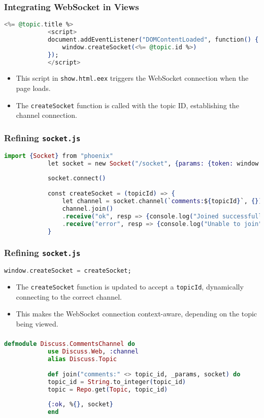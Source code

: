 \documentclass[aspectratio=169, table]{beamer}
\begin{document}
	\begin{frame}[fragile]
		\frametitle{Integrating WebSocket in Views}
		\begin{lstlisting}[language=Elixir]
			<%= @topic.title %>
			<script>
			document.addEventListener("DOMContentLoaded", function() {
				window.createSocket(<%= @topic.id %>)
			}); 
			</script>
		\end{lstlisting}
		\begin{itemize}
			\item This script in \texttt{show.html.eex} triggers the WebSocket connection when the page loads.
			\item The \texttt{createSocket} function is called with the topic ID, establishing the channel connection.
		\end{itemize}
	\end{frame}
	
	\begin{frame}[fragile]
		\frametitle{Refining \texttt{socket.js}}
		\begin{lstlisting}[language=Elixir]
			import {Socket} from "phoenix"
			let socket = new Socket("/socket", {params: {token: window.userToken}})
			
			socket.connect()
			
			const createSocket = (topicId) => {
				let channel = socket.channel(`comments:${topicId}`, {})
				channel.join()
				.receive("ok", resp => {console.log("Joined successfully", resp)})
				.receive("error", resp => {console.log("Unable to join", resp)})
			}
		\end{lstlisting}
	\end{frame}
	
	\begin{frame}[fragile]
		\frametitle{Refining \texttt{socket.js}}
		\begin{lstlisting}[language=Elixir]
			window.createSocket = createSocket;
		\end{lstlisting}
		\begin{itemize}
			\item The \texttt{createSocket} function is updated to accept a \texttt{topicId}, dynamically connecting to the correct channel.
			\item This makes the WebSocket connection context-aware, depending on the topic being viewed.
		\end{itemize}
	\end{frame}
	
	\begin{frame}[fragile]
		\frametitle{}
		\begin{lstlisting}[language=Elixir]
			defmodule Discuss.CommentsChannel do 
			use Discuss.Web, :channel
			alias Discuss.Topic
			
			def join("comments:" <> topic_id, _params, socket) do
			topic_id = String.to_integer(topic_id)
			topic = Repo.get(Topic, topic_id)
			
			{:ok, %{}, socket}
			end
		\end{lstlisting}
	\end{frame}
	
\end{document}
